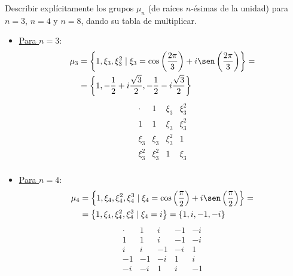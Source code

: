 \begin{ejercicio}\label{ej:2.4}
    Describir explícitamente los grupos $\mu_n$ (de raíces $n$-ésimas de la unidad) para $n = 3$, $n = 4$ y $n = 8$, dando su tabla de multiplicar.
    \begin{itemize}
        \item \ul{Para $n = 3$}:
        \begin{align*}
            \mu_3 &= \left\{1, \xi_3,\xi_3^2 \mid \xi_3 = \cos\left(\frac{2\pi}{3}\right) + i\sen\left(\frac{2\pi}{3}\right)\right\}
            =\\&= \left\{1, -\frac{1}{2} + i\frac{\sqrt{3}}{2}, -\frac{1}{2} - i\frac{\sqrt{3}}{2}\right\}
        \end{align*}
        \begin{equation*}
            \begin{array}{c|ccc}
                \cdot & 1 & \xi_3 & \xi_3^2 \\ \hline
                1 & 1 & \xi_3 & \xi_3^2 \\
                \xi_3 & \xi_3 & \xi_3^2 & 1 \\
                \xi_3^2 & \xi_3^2 & 1 & \xi_3 \\
            \end{array}
        \end{equation*}

        \item \ul{Para $n = 4$}:
        \begin{align*}
            \mu_4 &= \left\{1, \xi_4, \xi_4^2, \xi_4^3 \mid \xi_4 = \cos\left(\frac{\pi}{2}\right) + i\sen\left(\frac{\pi}{2}\right)\right\}
            =\\&= \left\{1, \xi_4, \xi_4^2, \xi_4^3 \mid \xi_4 = i\right\}
            = \left\{1, i, -1, -i\right\}
        \end{align*}
        \begin{equation*}
            \begin{array}{c|cccc}
                \cdot & 1 & i & -1 & -i \\ \hline
                1 & 1 & i & -1 & -i \\
                i & i & -1 & -i & 1 \\
                -1 & -1 & -i & 1 & i \\
                -i & -i & 1 & i & -1
            \end{array}
        \end{equation*}


\end{itemize}
\end{ejercicio}
